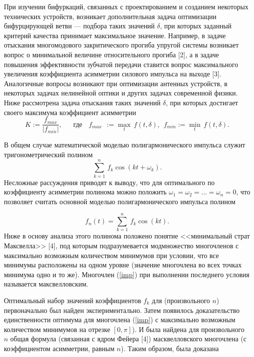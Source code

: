 При изучении бифуркаций, связанных с проектированием и созданием
некоторых технических устройств, возникает дополнительная задача
оптимизации бифурцирующей ветви --- подбора таких значений $\delta$,
при которых заданный критерий качества принимает максимальное
значение. Например, в задаче отыскания многомодового закритического
прогиба упругой системы возникает вопрос о минимальной величине
относительного прогиба [2], а в задаче
повышения эффективности зубчатой передачи ставится вопрос
максимального увеличения коэффициента асимметрии силового импульса
на выходе [3]. Аналогичные вопросы возникают при
оптимизации антенных устройств, в некоторых задачах нелинейной
оптики и других задачах современной физики. Ниже
рассмотрена задача отыскания таких значений $\delta$, при которых
достигает своего максимума коэффициент асимметрии
  \begin{equation}\label{KN}
K := \frac{f_{max}}{|f_{min}|}, \ \ \ \ \ \ \mathop{\textrm{где}} \
\ \ f_{max} \ \ := \max\limits_t\,f(t,\delta), \ \  f_{min} :=
\min\limits_t\,f(t,\delta).
  \end{equation}

В общем случае математической моделью полигармонического импульса
служит тригонометрический полином
  \begin{equation}\label{imp-gen}
\sum\limits_{k=1}^n\,f_k\cos(kt+\omega_k).
   \end{equation}
Несложные рассуждения приводят к выводу, что для оптимального по
коэффициенту асимметрии полинома можно положить
$\omega_1=\omega_2=\dots = \omega_n = 0$, что позволяет считать
основной моделью полигармонического импульса полином

  \begin{equation}\label{imp}
f_n(t)=\sum\limits_{k=1}^n\,f_k\cos(kt).
   \end{equation}
Ниже в основу анализа этого полинома положено понятие <<минимальный
страт Максвелла>> [4], под которым
подразумевается модмножество многочленов с максимально возможным
количеством минимумов при условии, что все минимумы расположены на
одном уровне (значение многочлена во всех точках минимума одно и то
же). Многочлен (\ref{imp}) при выполнении последнего условия
называется максвелловским.

Оптимальный набор значений коэффициентов $f_k$ для (произвольного
$n$) первоначально был найден экспериментально. Затем появилось
доказательство единственности оптимума для многочлена (\ref{imp}) с
максимально возможным количеством минимумов на отрезке $[0,\pi]$). И была найдена для
произвольного $n$ общая формула (связанная с ядром Фейера
[4]) масквелловского многочлена (с коэффициентом
асимметрии, равным $n$). Таким образом, была доказана

